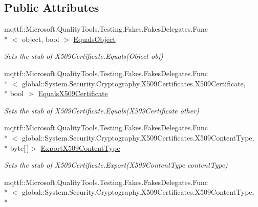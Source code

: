 \subsection*{Public Attributes}
\begin{DoxyCompactItemize}
\item 
mqttf\-::\-Microsoft.\-Quality\-Tools.\-Testing.\-Fakes.\-Fakes\-Delegates.\-Func\\*
$<$ object, bool $>$ \hyperlink{class_system_1_1_security_1_1_cryptography_1_1_x509_certificates_1_1_fakes_1_1_stub_x509_certificate_a096800d5db57a8350a336a5b3ecf1f4f}{Equals\-Object}
\begin{DoxyCompactList}\small\item\em Sets the stub of X509\-Certificate.\-Equals(\-Object obj)\end{DoxyCompactList}\item 
mqttf\-::\-Microsoft.\-Quality\-Tools.\-Testing.\-Fakes.\-Fakes\-Delegates.\-Func\\*
$<$ global\-::\-System.\-Security.\-Cryptography.\-X509\-Certificates.\-X509\-Certificate, \\*
bool $>$ \hyperlink{class_system_1_1_security_1_1_cryptography_1_1_x509_certificates_1_1_fakes_1_1_stub_x509_certificate_a2d8dd2836744dc542542b919c4960bf5}{Equals\-X509\-Certificate}
\begin{DoxyCompactList}\small\item\em Sets the stub of X509\-Certificate.\-Equals(\-X509\-Certificate other)\end{DoxyCompactList}\item 
mqttf\-::\-Microsoft.\-Quality\-Tools.\-Testing.\-Fakes.\-Fakes\-Delegates.\-Func\\*
$<$ global\-::\-System.\-Security.\-Cryptography.\-X509\-Certificates.\-X509\-Content\-Type, \\*
byte\mbox{[}$\,$\mbox{]}$>$ \hyperlink{class_system_1_1_security_1_1_cryptography_1_1_x509_certificates_1_1_fakes_1_1_stub_x509_certificate_a97bf16f0cdadec42a9ed372c3584c17e}{Export\-X509\-Content\-Type}
\begin{DoxyCompactList}\small\item\em Sets the stub of X509\-Certificate.\-Export(\-X509\-Content\-Type content\-Type)\end{DoxyCompactList}\item 
mqttf\-::\-Microsoft.\-Quality\-Tools.\-Testing.\-Fakes.\-Fakes\-Delegates.\-Func\\*
$<$ global\-::\-System.\-Security.\-Cryptography.\-X509\-Certificates.\-X509\-Content\-Type, \\*

\end{DoxyCompactItemize}
